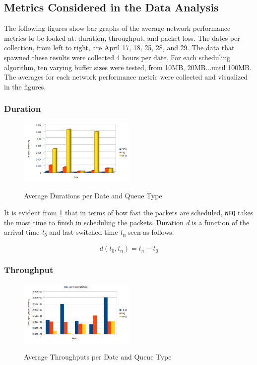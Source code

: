 \documentclass[journal]{IEEE/IEEEtran}
\begin{document}
\subsection{Metrics Considered in the Data Analysis}
The following figures show bar graphs of the average network performance metrics to be looked at: duration, throughput, and packet loss. The dates per collection, from left to right, are April 17, 18, 25, 28, and 29. The data that spawned these results were collected 4 hours per date. For each scheduling algorithm, ten varying buffer sizes were tested, from 10MB, 20MB...until 100MB. The averages for each network performance metric were collected and visualized in the figures.

\subsubsection{Duration}

\begin{figure}
\includegraphics[width=0.5\textwidth]{duration}
\label{fig:duration}\caption{Average Durations per Date and Queue Type}
\end{figure}

It is evident from \ref{fig:duration} that in terms of how fast the packets are scheduled, \texttt{WFQ} takes the most time to finish in scheduling the packets. Duration \textit{d} is a function of the arrival time \textit{t\textsubscript{0}} and last switched time \textit{t\textsubscript{n}} seen as follows:

\[
	d(t_0, t_n) = t_n - t_0
\]

\subsubsection{Throughput}
\begin{figure}
\includegraphics[width=0.5\textwidth]{throughput}
\label{fig:throughput}\caption{Average Throughputs per Date and Queue Type}
\end{figure}
\end{document}
